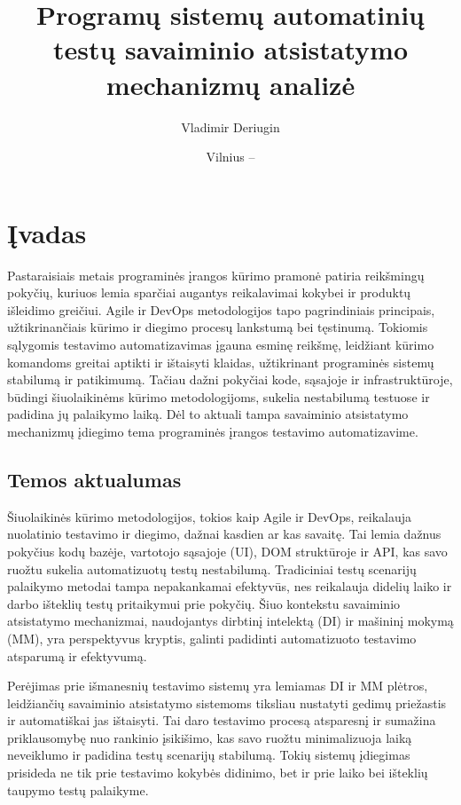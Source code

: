\documentclass[
]{VUMIFPSkursinis}
\title{Programų sistemų automatinių testų savaiminio atsistatymo mechanizmų analizė}
\author{Vladimir Deriugin}
\date{Vilnius – \the\year}
\begin{document}
\maketitle

\tableofcontents

\section{Įvadas}

Pastaraisiais metais programinės įrangos kūrimo pramonė patiria reikšmingų pokyčių, kuriuos lemia sparčiai augantys reikalavimai kokybei ir produktų išleidimo greičiui. Agile ir DevOps metodologijos tapo pagrindiniais principais, užtikrinančiais kūrimo ir diegimo procesų lankstumą bei tęstinumą. Tokiomis sąlygomis testavimo automatizavimas įgauna esminę reikšmę, leidžiant kūrimo komandoms greitai aptikti ir ištaisyti klaidas, užtikrinant programinės sistemų stabilumą ir patikimumą. Tačiau dažni pokyčiai kode, sąsajoje ir infrastruktūroje, būdingi šiuolaikinėms kūrimo metodologijoms, sukelia nestabilumą testuose ir padidina jų palaikymo laiką. Dėl to aktuali tampa savaiminio atsistatymo mechanizmų įdiegimo tema programinės įrangos testavimo automatizavime.

\subsection{Temos aktualumas}

Šiuolaikinės kūrimo metodologijos, tokios kaip Agile ir DevOps, reikalauja nuolatinio testavimo ir diegimo, dažnai kasdien ar kas savaitę. Tai lemia dažnus pokyčius kodų bazėje, vartotojo sąsajoje (UI), DOM struktūroje ir API, kas savo ruožtu sukelia automatizuotų testų nestabilumą. Tradiciniai testų scenarijų palaikymo metodai tampa nepakankamai efektyvūs, nes reikalauja didelių laiko ir darbo išteklių testų pritaikymui prie pokyčių. Šiuo kontekstu savaiminio atsistatymo mechanizmai, naudojantys dirbtinį intelektą (DI) ir mašininį mokymą (MM), yra perspektyvus kryptis, galinti padidinti automatizuoto testavimo atsparumą ir efektyvumą.

Perėjimas prie išmanesnių testavimo sistemų yra lemiamas DI ir MM plėtros, leidžiančių savaiminio atsistatymo sistemoms tiksliau nustatyti gedimų priežastis ir automatiškai jas ištaisyti. Tai daro testavimo procesą atsparesnį ir sumažina priklausomybę nuo rankinio įsikišimo, kas savo ruožtu minimalizuoja laiką neveiklumo ir padidina testų scenarijų stabilumą. Tokių sistemų įdiegimas prisideda ne tik prie testavimo kokybės didinimo, bet ir prie laiko bei išteklių taupymo testų palaikyme.
\end{document}
